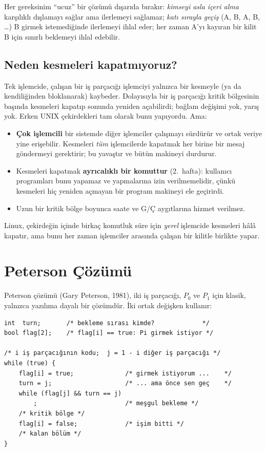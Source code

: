 Her gereksinim ``ucuz'' bir çözümü dışarıda bırakır: \emph{kimseyi asla içeri alma} karşılıklı dışlamayı sağlar ama ilerlemeyi sağlamaz; \emph{katı sırayla geçiş} (A, B, A, B, \dots) B girmek istemediğinde ilerlemeyi ihlal eder; her zaman A'yı kayıran bir kilit B için sınırlı beklemeyi ihlal edebilir.

\subsection{Neden kesmeleri kapatmıyoruz?}

Tek işlemcide, çalışan bir iş parçacığı işlemciyi yalnızca bir kesmeyle (ya da kendiliğinden bloklanarak) kaybeder. Dolayısıyla bir iş parçacığı kritik bölgesinin başında kesmeleri kapatıp sonunda yeniden açabilirdi; bağlam değişimi yok, yarış yok. Erken UNIX çekirdekleri tam olarak bunu yapıyordu. Ama:
\begin{itemize}
  \item \textbf{Çok işlemcili} bir sistemde diğer işlemciler çalışmayı sürdürür ve ortak veriye yine erişebilir. Kesmeleri \emph{tüm} işlemcilerde kapatmak her birine bir mesaj göndermeyi gerektirir; bu yavaştır ve bütün makineyi durdurur.
  \item Kesmeleri kapatmak \textbf{ayrıcalıklı bir komuttur} (2.~hafta): kullanıcı programları bunu yapamaz ve yapmalarına izin verilmemelidir, çünkü kesmeleri hiç yeniden açmayan bir program makineyi ele geçirirdi.
  \item Uzun bir kritik bölge boyunca saate ve G/Ç aygıtlarına hizmet verilmez.
\end{itemize}
Linux, çekirdeğin içinde birkaç komutluk süre için \emph{yerel} işlemcide kesmeleri hâlâ kapatır, ama bunu her zaman işlemciler arasında çalışan bir kilitle birlikte yapar.

\section{Peterson Çözümü}

Peterson çözümü (Gary Peterson, 1981), iki iş parçacığı, $P_0$ ve $P_1$ için klasik, yalnızca yazılıma dayalı bir çözümdür. İki ortak değişken kullanır:
\begin{lstlisting}
int  turn;       /* bekleme sırası kimde?             */
bool flag[2];    /* flag[i] == true: Pi girmek istiyor */

/* i iş parçacığının kodu;  j = 1 - i diğer iş parçacığı */
while (true) {
    flag[i] = true;              /* girmek istiyorum ...    */
    turn = j;                    /* ... ama önce sen geç    */
    while (flag[j] && turn == j)
        ;                        /* meşgul bekleme */
    /* kritik bölge */
    flag[i] = false;             /* işim bitti */
    /* kalan bölüm */
}
\end{lstlisting}

